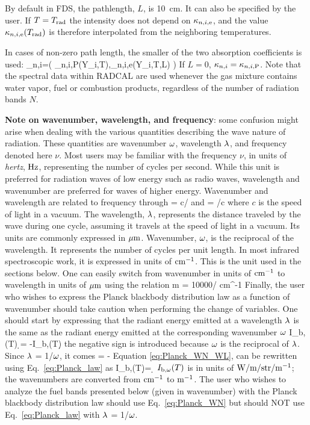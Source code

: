 By default in FDS, the pathlength, $L$, is 10~cm. It can also be specified by the user. If $T=T_{\rm rad}$ the intensity does not depend on $\kappa_{n,i,{\rm e}}$, and the value $\kappa_{n,i,{\rm e}}(T_{\rm rad})$ is therefore interpolated from the neighboring temperatures.

In cases of non-zero path length, the smaller of the two absorption coefficients is used:
\be
   \kappa_{n,i}=\min \Big( \kappa_{n,i,{\rm P}}(Y_i,T),\kappa_{n,i,{\rm e}}(Y_i,T,L) \Big)
\ee
If $L=0$, $\kappa_{n,i}=\kappa_{n,i,{\rm P}}$. Note that the spectral data within RADCAL are used whenever the gas mixture contains water vapor, fuel or combustion products, regardless of the number of radiation bands $N$.

\textbf{Note on wavenumber, wavelength, and frequency}: some confusion might arise when dealing with the various quantities describing the wave nature of radiation. These quantities are wavenumber $\omega$, wavelength $\lambda$, and frequency denoted here $\nu$. Most users may be familiar with the frequency $\nu$, in units of \textit{hertz}, ${\rm Hz}$, representing the number of cycles per second. While this unit is preferred for radiation waves of low energy such as radio waves, wavelength and wavenumber are preferred for waves of higher energy. Wavenumber and wavelength are related to frequency through \cite{Penner:1959}
\be
 \la = c/\nu \: \: \rm{and} \: \: \om = \nu /c
\ee
where $c$ is the speed of light in a vacuum. The wavelength, $\lambda$, represents the distance traveled by the wave during one cycle, assuming it travels at the speed of light in a vacuum. Its units are commonly expressed in ${\rm \mu m}$. Wavenumber, $\omega$, is the reciprocal of the wavelength. It represents the number of cycles per unit length. In most infrared spectroscopic work, it is expressed in units of ${\rm cm^{-1}}$. This is the unit used in the sections below. One can  easily switch from wavenumber in units of ${\rm cm^{-1}}$ to wavelength in units of ${\rm \mu m}$ using the relation
\be
  \la \; {\rm \mu m}  \; = 10000/\om \; \; {\rm cm^{-1}}
\ee
Finally, the user who wishes to express the Planck blackbody distribution law
as a function of wavenumber should take caution when performing the change of variables. One should start by expressing that the radiant energy emitted
at a wavelength $\lambda$ is the same as the radiant energy emitted at the corresponding wavenumber $\omega$ \cite{Tien:1968}
\be \label{eq:Planck_WN_WL}
I_{\rm b,\la}(T) \d \la = -I_{\rm b,\om}(T)\d \om
\ee
the negative sign is introduced because $\omega$ is the reciprocal of $\lambda$.
Since $\lambda$ = 1/$\omega$, it comes
\be
\dfrac{\d \la}{\d \om} = -
\ee
Equation \ref{eq:Planck_WN_WL},
can be rewritten using Eq.~\ref{eq:Planck_law} as
\be\label{eq:Planck_WN}
  I_{\rm b,\om}(T)\d \om = \d \om
\ee
$I_{\rm b,\omega}(T)$ is in units of $\rm{W/m/str/m^{-1}}$; the wavenumbers are converted from $\rm{cm^{-1}}$ to $\rm{m^{-1}}$.
The user who wishes to analyze the fuel bands presented below (given in wavenumber) with the Planck blackbody distribution law should use Eq.~\ref{eq:Planck_WN} but should NOT use Eq.~\ref{eq:Planck_law} with $\lambda$ = 1/$\omega$.



